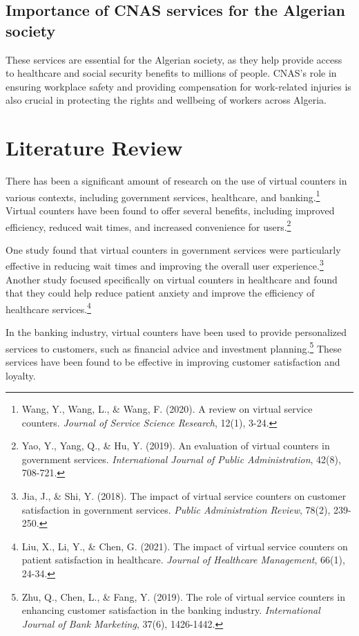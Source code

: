 \subsection{  Importance of CNAS services for the Algerian society}
These services are essential for the Algerian society, as they help provide access to healthcare and social security benefits to millions of people. CNAS's role in ensuring workplace safety and providing compensation for work-related injuries is also crucial in protecting the rights and wellbeing of workers across Algeria.
\section{Literature Review}
\label{sec:literature-review}

There has been a significant amount of research on the use of virtual counters in various contexts, including government services, healthcare, and banking.\footnote{Wang, Y., Wang, L., \& Wang, F. (2020). A review on virtual service counters. \textit{Journal of Service Science Research}, 12(1), 3-24.} Virtual counters have been found to offer several benefits, including improved efficiency, reduced wait times, and increased convenience for users.\footnote{Yao, Y., Yang, Q., \& Hu, Y. (2019). An evaluation of virtual counters in government services. \textit{International Journal of Public Administration}, 42(8), 708-721.}

One study found that virtual counters in government services were particularly effective in reducing wait times and improving the overall user experience.\footnote{Jia, J., \& Shi, Y. (2018). The impact of virtual service counters on customer satisfaction in government services. \textit{Public Administration Review}, 78(2), 239-250.} Another study focused specifically on virtual counters in healthcare and found that they could help reduce patient anxiety and improve the efficiency of healthcare services.\footnote{Liu, X., Li, Y., \& Chen, G. (2021). The impact of virtual service counters on patient satisfaction in healthcare. \textit{Journal of Healthcare Management}, 66(1), 24-34.}

In the banking industry, virtual counters have been used to provide personalized services to customers, such as financial advice and investment planning.\footnote{Zhu, Q., Chen, L., \& Fang, Y. (2019). The role of virtual service counters in enhancing customer satisfaction in the banking industry. \textit{International Journal of Bank Marketing}, 37(6), 1426-1442.} These services have been found to be effective in improving customer satisfaction and loyalty.

